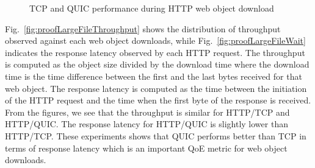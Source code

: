 \begin{figure}[!ht]
	\captionsetup[subfigure]{}
	\begin{center}
	\end{center}
	\caption{\label{fig:proofLargeFile}TCP and QUIC performance during HTTP web object download}
\end{figure}


Fig.~\ref{fig:proofLargeFileThroughput} shows the distribution of throughput observed against each web object downloads, while Fig.~\ref{fig:proofLargeFileWait} indicates the response latency observed by each HTTP request. The throughput is computed as the object size divided by the download time where the download time is the time difference between the first and the last bytes received for that web object. The response latency is computed as the time between the initiation of the HTTP request and the time when the first byte of the response is received. From the figures, we see that the throughput is similar for HTTP/TCP and HTTP/QUIC. The response latency for HTTP/QUIC is slightly lower than HTTP/TCP. These experiments shows that QUIC performs better than TCP in terms of response latency which is an important QoE metric for web object downloads. 



